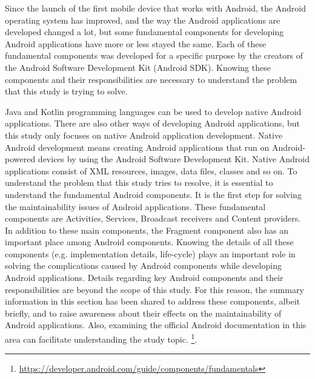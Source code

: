 Since the launch of the first mobile device that works with Android,  the Android operating system has improved, and the way the Android applications are developed changed a lot, but some fundamental components for developing Android applications have more or less stayed the same. Each of these fundamental components was developed for a specific purpose by the creators of the Android Software Development Kit (Android SDK). Knowing these components and their responsibilities are necessary to understand the problem that this study is trying to solve.

Java and Kotlin programming languages can be used to develop native Android applications. There are also other ways of developing Android applications, but this study only focuses on native Android application development. Native Android development means creating Android applications that run on Android-powered devices by using the Android Software Development Kit. Native Android applications consist of  XML resources, images, data files, classes and so on. To understand the problem that this study tries to resolve, it is essential to understand the fundamental Android components. It is the first step for solving the maintainability issues of Android applications. These fundamental components are Activities, Services, Broadcast receivers and Content providers. In addition to these main components, the Fragment component also has an important place among Android components. Knowing the details of all these components (e.g. implementation details, life-cycle) plays an important role in solving the complications caused by Android components while developing Android applications. Details regarding key Android components and their responsibilities are beyond the scope of this study. For this reason, the summary information in this section has been shared to address these components, albeit briefly, and to raise awareness about their effects on the maintainability of Android applications. Also, examining the official Android documentation in this area can facilitate understanding the study topic. \footnote{\url{https://developer.android.com/guide/components/fundamentals}}.